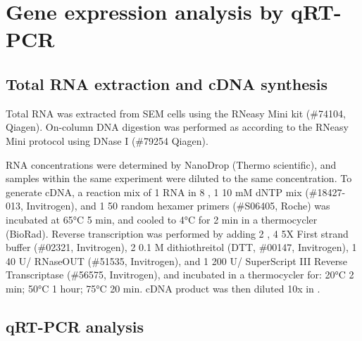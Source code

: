 \section{Gene expression analysis by qRT-PCR}

\subsection{\label{ch2_rna-extract}Total RNA extraction and cDNA synthesis}
Total RNA was extracted from  SEM cells using the RNeasy Mini kit (\#74104, Qiagen). On-column DNA digestion was performed as according to the RNeasy Mini protocol using DNase I (\#79254 Qiagen). 

RNA concentrations were determined by NanoDrop (Thermo scientific), and samples within the same experiment were diluted to the same concentration. To generate cDNA, a reaction mix of 1 \microg{} RNA in 8 \microl{} \water{}, 1 \microl{} 10 mM dNTP mix (\#18427-013, Invitrogen), and 1 \microl{} 50 \microm{} random hexamer primers (\#S06405, Roche) was incubated at 65°C 5 min, and cooled to 4°C for 2 min in a thermocycler (BioRad). Reverse transcription was performed by adding 2 \microl{} \water, 4 \microl{} 5X First strand buffer (\#02321, Invitrogen), 2 \microl{} 0.1 M dithiothreitol (DTT, \#00147, Invitrogen), 1 \microl{} 40 U/\microl{} RNaseOUT (\#51535, Invitrogen), and 1 \microl{} 200 U/\microl{} SuperScript III Reverse Transcriptase (\#56575, Invitrogen), and incubated in a thermocycler for: 20°C 2 min; 50°C 1 hour; 75°C 20 min. cDNA product was then diluted 10x in \water{}.

\subsection{\label{ch2_qpcr}qRT-PCR analysis}

